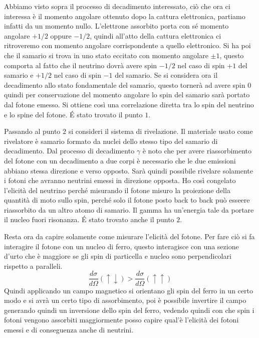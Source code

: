 Abbiamo visto sopra il processo di decadimento interessato, ciò che ora ci interessa è il momento angolare ottenuto dopo la cattura elettronica, partiamo infatti da un momento nullo.
L'elettrone assorbito porta con sé momento angolare $+1/2$ oppure $-1/2$, quindi all'atto della cattura elettronica ci ritroveremo con momento angolare corrispondente a quello elettronico.
Si ha poi che il samario si trova in uno stato eccitato con momento angolare $\pm 1$, questo comporta al fatto che il neutrino dovrà avere spin $-1/2$ nel caso di spin $+1$ del samario e $+1/2$ nel caso di spin $-1$ del samario.
Se si considera ora il decadimento allo stato fondamentale del samario, questo tornerà ad avere spin $0$ quindi per conservazione del momento angolare lo spin del samario sarà portato dal fotone emesso.
Si ottiene così una correlazione diretta tra lo spin del neutrino e lo spine del fotone.
\'E stato trovato il punto $1$.
 
Passando al punto $2$ si consideri il sistema di rivelazione.
Il materiale usato come rivelatore è samario formato da nuclei dello stesso tipo del samario di decadimento.
Dal processo di decadimento $\gamma$ è noto che per avere riassorbimento del fotone con un decadimento a due corpi è necessario
che le due emissioni abbiano stessa direzione e verso opposto.
Sarà quindi possibile rivelare solamente i fotoni che avranno neutrini emessi in direzione opposta. 
Ho così congelato l'elicità del neutrino perché misurando il fotone misuro la proiezione della quantità di moto sullo spin, perché solo il fotone posto back to back può esseere riassorbito da un altro atomo di samario.
Il gamma ha un'energia tale da portare il nucleo fuori risonanza.
\'E stato trovato anche il punto $2$.

Resta ora da capire solamente come misurare l'elicità del fotone.
Per fare ciò si fa interagire il fotone con un nucleo di ferro, questo interagisce con una sezione d'urto che è maggiore se gli spin di particella e nucleo sono perpendicolari rispetto a paralleli.
\begin{equation}
\frac{d\sigma}{d\Omega}(\uparrow\downarrow)>\frac{d\sigma}{d\Omega}(\uparrow\uparrow)
\end{equation}
Quindi applicando un campo magnetico si orientano gli spin del ferro in un certo modo e si avrà un certo tipo di assorbimento, poi è possibile invertire il campo generando quindi un inversione dello spin del ferro, vedendo quindi con che spin i fotoni vengono assorbiti maggiormente posso capire qual'è l'elicità dei fotoni emessi e di conseguenza anche di neutrini.

